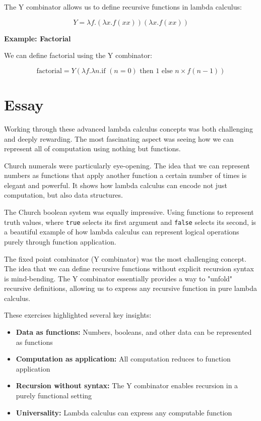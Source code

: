 \documentclass{article}
\theoremstyle{plain}
\theoremstyle{definition}
\theoremstyle{remark}
\begin{document}
The Y combinator allows us to define recursive functions in lambda calculus:

$$Y = \lambda f.(\lambda x.f(x x))(\lambda x.f(x x))$$

\textbf{Example: Factorial}

We can define factorial using the Y combinator:

$$\text{factorial} = Y(\lambda f.\lambda n.\text{if } (n = 0) \text{ then } 1 \text{ else } n \times f(n-1))$$

\section{Essay}

Working through these advanced lambda calculus concepts was both challenging and deeply rewarding. The most fascinating aspect was seeing how we can represent all of computation using nothing but functions.

Church numerals were particularly eye-opening. The idea that we can represent numbers as functions that apply another function a certain number of times is elegant and powerful. It shows how lambda calculus can encode not just computation, but also data structures.

The Church boolean system was equally impressive. Using functions to represent truth values, where \texttt{true} selects its first argument and \texttt{false} selects its second, is a beautiful example of how lambda calculus can represent logical operations purely through function application.

The fixed point combinator (Y combinator) was the most challenging concept. The idea that we can define recursive functions without explicit recursion syntax is mind-bending. The Y combinator essentially provides a way to "unfold" recursive definitions, allowing us to express any recursive function in pure lambda calculus.

These exercises highlighted several key insights:

\begin{itemize}
\item \textbf{Data as functions:} Numbers, booleans, and other data can be represented as functions
\item \textbf{Computation as application:} All computation reduces to function application
\item \textbf{Recursion without syntax:} The Y combinator enables recursion in a purely functional setting
\item \textbf{Universality:} Lambda calculus can express any computable function
\end{itemize}
\end{document}
